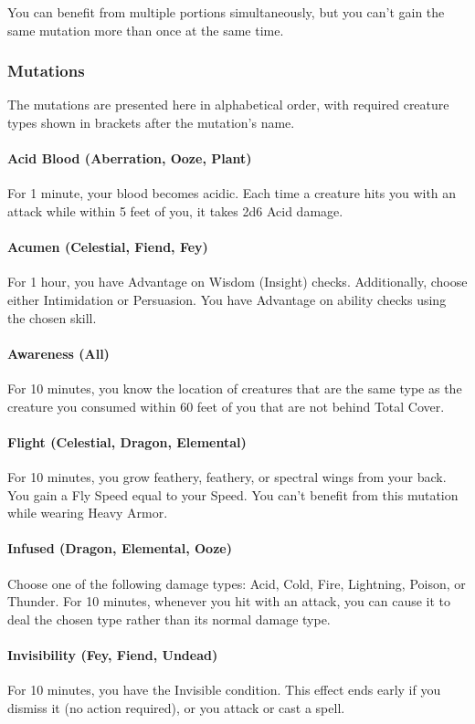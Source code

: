 \documentclass[letterpaper,openany,oneside,twocolumn]{book}
\begin{document}
You can benefit from multiple portions simultaneously, but you can't gain the same mutation more than once at the same time.
\subsubsection*{Mutations}
The mutations are presented here in alphabetical order, with required creature types shown in brackets after the mutation's name.
\paragraph*{Acid Blood (Aberration, Ooze, Plant)} For 1 minute, your blood becomes acidic. Each time a creature hits you with an attack while within 5 feet of you, it takes 2d6 Acid damage.
\paragraph*{Acumen (Celestial, Fiend, Fey)} For 1 hour, you have Advantage on Wisdom (Insight) checks. Additionally, choose either Intimidation or Persuasion. You have Advantage on ability checks using the chosen skill.
\paragraph*{Awareness (All)} For 10 minutes, you know the location of creatures that are the same type as the creature you consumed within 60 feet of you that are not behind Total Cover.
\paragraph*{Flight (Celestial, Dragon, Elemental)} For 10 minutes, you grow feathery, feathery, or spectral wings from your back. You gain a Fly Speed equal to your Speed. You can't benefit from this mutation while wearing Heavy Armor.
\paragraph*{Infused (Dragon, Elemental, Ooze)} Choose one of the following damage types: Acid, Cold, Fire, Lightning, Poison, or Thunder. For 10 minutes, whenever you hit with an attack, you can cause it to deal the chosen type rather than its normal damage type.
\paragraph*{Invisibility (Fey, Fiend, Undead)} For 10 minutes, you have the Invisible condition. This effect ends early if you dismiss it (no action required), or you attack or cast a spell.
\end{document}
